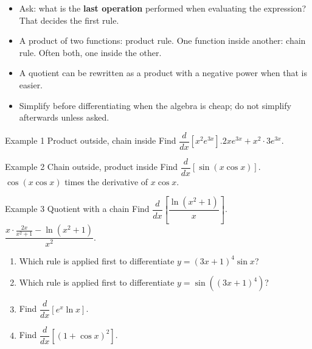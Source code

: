 \documentclass[11pt]{article}
\begin{document}

\begin{ideabox}
\begin{itemize}[leftmargin=*,itemsep=2pt,topsep=2pt]
  \item Ask: what is the \textbf{last operation} performed when evaluating the expression? That decides the first rule.
  \item A product of two functions: product rule. One function inside another: chain rule. Often both, one inside the other.
  \item A quotient can be rewritten as a product with a negative power when that is easier.
  \item Simplify before differentiating when the algebra is cheap; do not simplify afterwards unless asked.
\end{itemize}
\end{ideabox}

\begin{example}{Example 1 \textperiodcentered{} Product outside, chain inside}
Find $\dfrac{d}{dx}\left[x^2e^{3x}\right]$.\soln $2xe^{3x}+x^2\cdot3e^{3x}$.
\end{example}

\begin{example}{Example 2 \textperiodcentered{} Chain outside, product inside}
Find $\dfrac{d}{dx}[\sin(x\cos x)]$.\soln $\cos(x\cos x)$ times the derivative of $x\cos x$.
\end{example}

\begin{example}{Example 3 \textperiodcentered{} Quotient with a chain}
Find $\dfrac{d}{dx}\left[\dfrac{\ln\!\left(x^2+1\right)}{x}\right]$.\soln $\dfrac{x\cdot\frac{2x}{x^2+1}-\ln\!\left(x^2+1\right)}{x^2}$.
\end{example}

\newpage
{}

\begin{enumerate}[leftmargin=*,itemsep=2pt]
  \item Which rule is applied first to differentiate $y=(3x+1)^4\sin x$?\work{2.3cm}
  \item Which rule is applied first to differentiate $y=\sin\!\left((3x+1)^4\right)$?\work{2.3cm}
  \item Find $\dfrac{d}{dx}\left[e^{x}\ln x\right]$.\work{2.3cm}
  \item Find $\dfrac{d}{dx}\left[(1+\cos x)^2\right]$.\work{2.3cm}
\end{enumerate}
\end{document}
